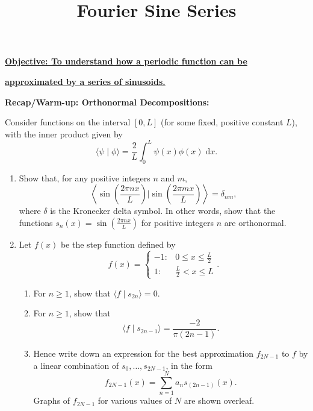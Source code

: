 \documentclass{article}
\newcommand{\diff}{\;\mathrm{d}}
\begin{document}
\title{Fourier Sine Series}
\date{}

\maketitle
\thispagestyle{empty}

\Large

\textbf{\underline{Objective: To understand how a periodic function can be}}

\textbf{\underline{approximated by a series of sinusoids.}}






\vspace{5mm}



\textbf{Recap/Warm-up: Orthonormal Decompositions:}\bigskip



Consider functions on the interval $[0,L]$ (for some fixed, positive constant $L$), with the inner product given by
\[\langle\psi\mid\phi\rangle=\frac{2}{L}\int_0^L \psi(x)\phi(x)\diff x.\]

\begin{enumerate}
	\item Show that, for any positive integers $n$ and $m$,
		\[\left\langle \sin\left(\frac{2\pi nx}{L}\right)\Bigg|\sin\left(\frac{2\pi mx}{L}\right)\right\rangle=\delta_{nm},\]
		where $\delta$ is the Kronecker delta symbol. In other words, show that the functions $s_n(x)=\sin\left(\frac{2\pi nx}{L}\right)$ for positive integers $n$ are orthonormal.
	\item Let $f(x)$ be the step function defined by
		\[f(x)=\begin{cases}
				-1: & 0\leq x\leq \frac{L}{2}\\
				1: & \frac{L}{2}<x\leq L
			\end{cases}.\]
		\begin{enumerate}
			\item For $n\geq 1$, show that $\langle f \mid s_{2n}\rangle=0$.
			\item For $n\geq 1$, show that
				\[\langle f\mid s_{2n-1}\rangle = \frac{-2}{\pi(2n-1)}.\]
			\item Hence write down an expression for the best approximation $f_{2N-1}$ to $f$ by a linear combination of $s_0,\hdots,s_{2N-1}$, in the form
				\[f_{2N-1}(x) = \sum_{n=1}^N a_n s_{(2n-1)}(x).\]
				Graphs of $f_{2N-1}$ for various values of $N$ are shown overleaf.
		\end{enumerate}
\end{enumerate}
\end{document}
